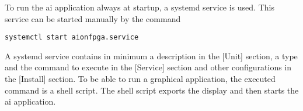 To run the \acrshort{ai} application always at startup, a systemd service is used.
This service can be started manually by the command
\begin{lstlisting}[style=bash, caption={}, label=lst:start_service]
  systemctl start aionfpga.service
\end{lstlisting}
A systemd service contains in minimum a description in the [Unit] section, a type and the command to execute in the [Service] section and other configurations in the [Install] section.
To be able to run a graphical application, the executed command is a shell script.
The shell script exports the display and then starts the \acrshort{ai} application.


